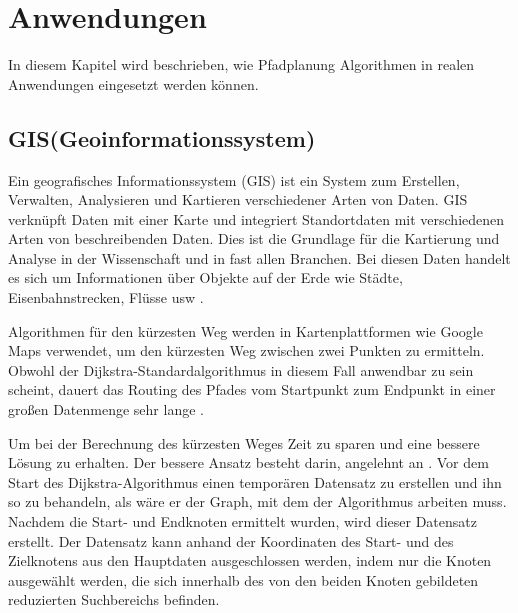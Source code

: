 \chapter{Anwendungen}
\label{Anwendungen}

In diesem Kapitel wird beschrieben, wie Pfadplanung Algorithmen in realen Anwendungen eingesetzt werden können.
\section{GIS(Geoinformationssystem)}
\label{GIS(Geoinformationssystem)}

Ein geografisches Informationssystem (GIS) ist ein System zum Erstellen, Verwalten, Analysieren und Kartieren verschiedener Arten von Daten. GIS verknüpft Daten mit einer Karte und integriert Standortdaten mit verschiedenen Arten von beschreibenden Daten. Dies ist die Grundlage für die Kartierung und Analyse in der Wissenschaft und in fast allen Branchen.
Bei diesen Daten handelt es sich um Informationen über Objekte auf der Erde wie Städte, Eisenbahnstrecken, Flüsse usw \cite{Vaibhavi2014}. 

Algorithmen für den kürzesten Weg werden in Kartenplattformen wie Google Maps verwendet, um den kürzesten Weg zwischen zwei Punkten zu ermitteln.
Obwohl der Dijkstra-Standardalgorithmus in diesem Fall anwendbar zu sein scheint, dauert das Routing des Pfades vom Startpunkt zum Endpunkt in einer großen Datenmenge sehr lange \cite{HamidAli2020}.

 Um bei der Berechnung des kürzesten Weges Zeit zu sparen und eine bessere Lösung zu erhalten. Der bessere Ansatz besteht darin, angelehnt an \cite{HamidAli2020}. Vor dem Start des Dijkstra-Algorithmus einen temporären Datensatz zu erstellen und ihn so zu behandeln, als wäre er der Graph, mit dem der Algorithmus arbeiten muss.
 Nachdem die Start- und Endknoten ermittelt wurden, wird dieser Datensatz erstellt. Der Datensatz kann anhand der Koordinaten des Start- und des Zielknotens aus den Hauptdaten ausgeschlossen werden, indem nur die Knoten ausgewählt werden, die sich innerhalb des von den beiden Knoten gebildeten reduzierten Suchbereichs befinden.
 


